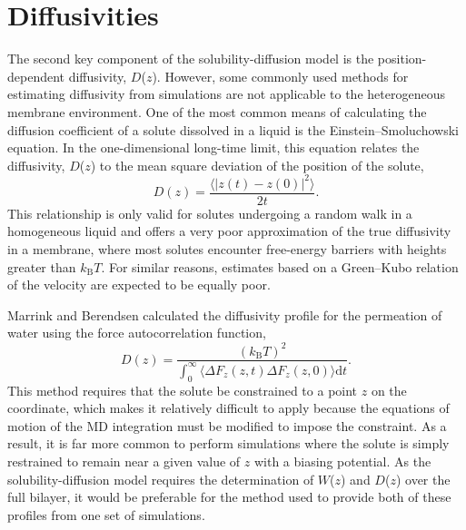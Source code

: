 
    \section*{Diffusivities}
    \par The second key component of the solubility-diffusion model is the position-dependent diffusivity, $D$($z$). However, some commonly used methods for estimating diffusivity from simulations are not applicable to the heterogeneous membrane environment. One of the most common means of calculating the diffusion coefficient of a solute dissolved in a liquid is the Einstein--Smoluchowski equation. In the one-dimensional long-time limit, this equation relates the diffusivity, $D$($z$) to the mean square deviation of the position of the solute,
    \begin{equation}
    D(z) = \frac{\langle \left| z(t) - z(0) \right|^2 \rangle}{2t}.
    \label{eq:einstein-smoluchowski}
    \end{equation}
    This relationship is only valid for solutes undergoing a random walk in a homogeneous liquid and offers a very poor approximation of the true diffusivity in a membrane, where most solutes encounter free-energy barriers with heights greater than $k_\mathrm{B} T$. For similar reasons, estimates based on a Green--Kubo relation of the velocity are expected to be equally poor\cite{Mamonov2006}. 
    
    \par Marrink and Berendsen calculated the diffusivity profile for the permeation of water using the force autocorrelation function,\cite{Marrink1994,Marrink1996}
    \begin{equation}
    D(z) = \frac{(k_\mathrm{B} T)^2}{\displaystyle \int_0^\infty \langle {\Delta}F_z(z,t)  {\Delta}F_z(z,0) \rangle \textrm{d}t}.
    \label{eq:diff_marrink}
    \end{equation}
    This method requires that the solute be constrained to a point $z$ on the coordinate, which makes it relatively difficult to apply because the equations of motion of the MD integration must be modified to impose the constraint.\cite{Wilson1985,Mamonov2006} As a result, it is far more common to perform simulations where the solute is simply restrained to remain near a given value of $z$ with a biasing potential. As the solubility-diffusion model requires the determination of $W$($z$) and $D$($z$) over the full bilayer, it would be preferable for the method used to provide both of these profiles from one set of simulations.

